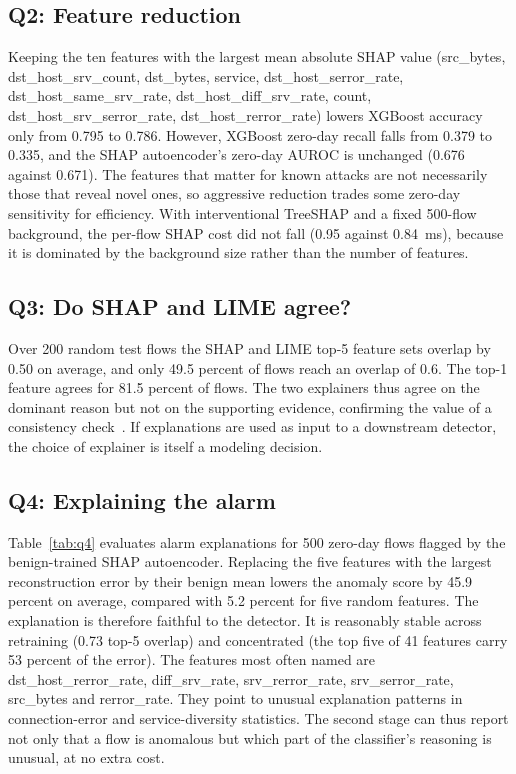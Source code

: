 \documentclass[conference]{IEEEtran}
\begin{document}
\subsection{Q2: Feature reduction}
Keeping the ten features with the largest mean absolute SHAP value (src\_bytes, dst\_host\_srv\_count, dst\_bytes, service, dst\_host\_serror\_rate, dst\_host\_same\_srv\_rate, dst\_host\_diff\_srv\_rate, count, dst\_host\_srv\_serror\_rate, dst\_host\_rerror\_rate) lowers XGBoost accuracy only from 0.795 to 0.786. However, XGBoost zero-day recall falls from 0.379 to 0.335, and the SHAP autoencoder's zero-day AUROC is unchanged (0.676 against 0.671). The features that matter for known attacks are not necessarily those that reveal novel ones, so aggressive reduction trades some zero-day sensitivity for efficiency. With interventional TreeSHAP and a fixed 500-flow background, the per-flow SHAP cost did not fall (0.95 against 0.84~ms), because it is dominated by the background size rather than the number of features.

\subsection{Q3: Do SHAP and LIME agree?}
Over 200 random test flows the SHAP and LIME top-5 feature sets overlap by 0.50 on average, and only 49.5 percent of flows reach an overlap of 0.6. The top-1 feature agrees for 81.5 percent of flows. The two explainers thus agree on the dominant reason but not on the supporting evidence, confirming the value of a consistency check~\cite{nugraha2025versatile}. If explanations are used as input to a downstream detector, the choice of explainer is itself a modeling decision.

\subsection{Q4: Explaining the alarm}
Table~\ref{tab:q4} evaluates alarm explanations for 500 zero-day flows flagged by the benign-trained SHAP autoencoder. Replacing the five features with the largest reconstruction error by their benign mean lowers the anomaly score by 45.9 percent on average, compared with 5.2 percent for five random features. The explanation is therefore faithful to the detector. It is reasonably stable across retraining (0.73 top-5 overlap) and concentrated (the top five of 41 features carry 53 percent of the error). The features most often named are dst\_host\_rerror\_rate, diff\_srv\_rate, srv\_rerror\_rate, srv\_serror\_rate, src\_bytes and rerror\_rate. They point to unusual explanation patterns in connection-error and service-diversity statistics. The second stage can thus report not only that a flow is anomalous but which part of the classifier's reasoning is unusual, at no extra cost.
\end{document}
